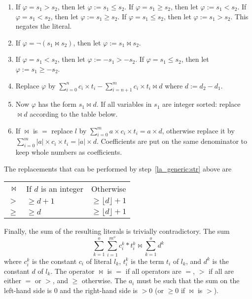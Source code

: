 \begin{enumerate}
    \item If $\varphi = s_1 > s_2$, then let $\varphi := s_1 \leq s_2$.
      If $\varphi = s_1 \geq s_2$, then let $\varphi := s_1 < s_2$.
      If $\varphi = s_1 < s_2$, then let $\varphi := s_1 \geq s_2$.
      If $\varphi = s_1 \leq s_2$, then let $\varphi := s_1 > s_2$. This negates
      the literal.
    
    \item If $\varphi = \neg (s_1 \bowtie s_2)$, then let $\varphi := s_1 \bowtie s_2$.
    
    \item If $\varphi = s_1 < s_2$, then let $\varphi :=   - s_1 > - s_2$.
      If $\varphi = s_1 \leq s_2$, then let $\varphi :=  s_1 \geq - s_2$.

    \item Replace $\varphi$ by $\sum_{i=0}^{n}c_i\times{}t_i - \sum_{i=n+1}^{m} c_i\times{}t_i
    \bowtie d$ where $d := d_2 - d_1$.
    
    \item \label{la_generic:str}Now $\varphi$ has the form $s_1 \bowtie d$. If all
    variables in $s_1$ are integer sorted: replace $\bowtie d$ according to
    the table below.
    
    \item If $\bowtie$ is $=$ replace $l$ by
    $\sum_{i=0}^{m}a\times{}c_i\times{}t_i = a\times{}d$, otherwise replace it by
    $\sum_{i=0}^{m}|a|\times{}c_i\times{}t_i = |a|\times{}d$.
    Coefficients are put on the same denominator to keep whole numbers as coefficients.
\end{enumerate}

The replacements that can be performed by step~\ref{la_generic:str} above
are

\begin{tabular}{r l l}
$\bowtie$  & If $d$ is an integer  & Otherwise \\
$>$        & $\geq d + 1$  & $\geq \lfloor d\rfloor + 1$  \\
$\geq$     & $\geq d$      & $\geq \lfloor d\rfloor + 1$  \\
\end{tabular}

Finally, the sum of the resulting literals is trivially contradictory.
The sum
\[
    \sum_{k=1}^{o}\sum_{i=1}^{m^o}c_i^k*t_i^k \bowtie \sum_{k=1}^{o}d^k
\]
where $c_i^k$ is the constant $c_i$ of literal $l_k$, $t_i^k$ is the term
$t_i$ of $l_k$, and $d^k$ is the constant $d$ of $l_k$. The operator
$\bowtie$ is $=$ if all operators are $=$, $>$ if all are
either $=$ or $>$, and $\geq$ otherwise. The $a_i$ must be such
that the sum on the left-hand side is $0$ and the right-hand side is $>0$ (or
$\geq 0$ if $\bowtie$ is $>$).

